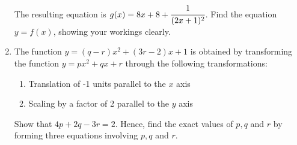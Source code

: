 \documentclass[letterpaper]{article}
\begin{document}
\begin{enumerate}
The resulting equation is $g(x)=8x + 8 + \cfrac{1}{(2x + 1)^2}$. Find the equation $y=f(x)$, showing your workings clearly.

\item The function $y=(q-r)x^2 + (3r - 2)x + 1$ is obtained by transforming the function $y=px^2 + qx + r$ through the following transformations:

\begin{enumerate}
\item Translation of -1 units parallel to the $x$ axis
\item Scaling by a factor of 2 parallel to the $y$ axis
\end{enumerate}

Show that $4p + 2q - 3r = 2$. Hence, find the exact values of $p, q$ and $r$ by forming three equations involving $p, q$ and $r$.
\end{enumerate}
\end{document}
